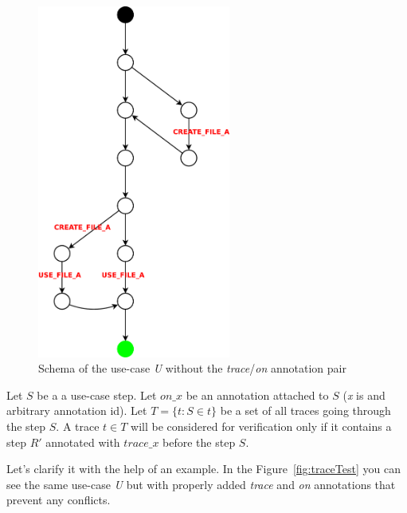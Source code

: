 \begin{figure}[ht]
  \centering
  \includegraphics[width=180pt]{images/traceTest_no_trace}
  \caption{Schema of the use-case \emph{U} without the \emph{trace}/\emph{on} annotation pair}
  \label{fig:traceTest_no_trace}
\end{figure}


\begin{definition}
	Let $S$ be a a use-case step.
	Let $on\_x$ be an annotation attached to $S$ (\emph{x} is and arbitrary annotation id).
	Let $T=\{t: S \in t\}$ be a set of all traces going through the step $S$.
	A trace $t \in T$ will be considered for verification only if it contains a step $R'$ annotated with $trace\_x$ before the step $S$.
\end{definition}

Let's clarify it with the help of an example.
In the Figure~\ref{fig:traceTest} you can see the same use-case \emph{U} but with properly added
\emph{trace} and \emph{on} annotations that prevent any conflicts.

